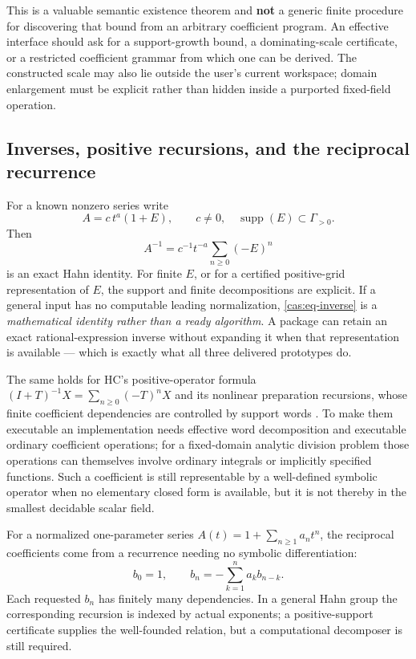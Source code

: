 \documentclass[11pt,letterpaper]{article}
\numberwithin{equation}{section}
\theoremstyle{definition}
\theoremstyle{remark}
\newcommand{\supp}{\operatorname{supp}}
\begin{document}
This is a valuable semantic existence theorem and \textbf{not} a generic finite
procedure for discovering that bound from an arbitrary coefficient program. An
effective interface should ask for a support-growth bound, a dominating-scale
certificate, or a restricted coefficient grammar from which one can be derived.
The constructed scale may also lie outside the user's current workspace; domain
enlargement must be explicit rather than hidden inside a purported fixed-field
operation.

\subsection{Inverses, positive recursions, and the reciprocal recurrence}
\label{cas:sub-inverses}
For a known nonzero series write
\begin{equation}\label{cas:eq-unit}
 A=c\,t^a(1+E),\qquad c\ne0,\quad \supp(E)\subset\Gamma_{>0}.
\end{equation}
Then
\begin{equation}\label{cas:eq-inverse}
 A^{-1}=c^{-1}t^{-a}\sum_{n\ge0}(-E)^n
\end{equation}
is an exact Hahn identity. For finite $E$, or for a certified positive-grid
representation of $E$, the support and finite decompositions are explicit. If a
general input has no computable leading normalization, \eqref{cas:eq-inverse} is
a \emph{mathematical identity rather than a ready algorithm}. A package can
retain an exact rational-expression inverse without expanding it when that
representation is available --- which is exactly what all three delivered
prototypes do.

The same holds for HC's positive-operator formula
$(I+T)^{-1}X=\sum_{n\ge0}(-T)^nX$ and its nonlinear preparation recursions,
whose finite coefficient dependencies are controlled by support words
\cite{cas:SourceResearch}. To make them executable an implementation needs
effective word decomposition and executable ordinary coefficient operations; for
a fixed-domain analytic division problem those operations can themselves involve
ordinary integrals or implicitly specified functions. Such a coefficient is
still representable by a well-defined symbolic operator when no elementary
closed form is available, but it is not thereby in the smallest decidable scalar
field.

For a normalized one-parameter series $A(t)=1+\sum_{n\ge1}a_nt^n$, the reciprocal
coefficients come from a recurrence needing no symbolic differentiation:
\[
 b_0=1,\qquad b_n=-\sum_{k=1}^n a_kb_{n-k}.
\]
Each requested $b_n$ has finitely many dependencies. In a general Hahn group the
corresponding recursion is indexed by actual exponents; a positive-support
certificate supplies the well-founded relation, but a computational decomposer
is still required.
\end{document}
